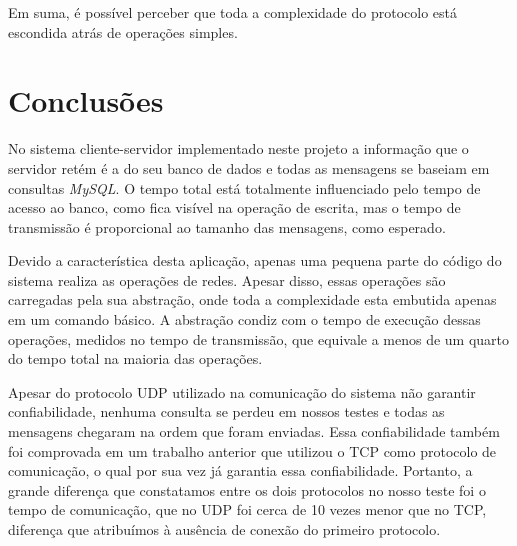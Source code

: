 \documentclass[12pt,a4paper]{article}
\begin{document}
Em suma, é possível perceber que toda a complexidade do protocolo está escondida atrás de operações simples.

\section{Conclusões}

No sistema cliente-servidor implementado neste projeto a informação que o servidor retém é a do seu banco de dados e todas as mensagens se baseiam em consultas {\it MySQL}. O tempo total está totalmente influenciado pelo tempo de acesso ao banco, como fica visível na operação de escrita, mas o tempo de transmissão é proporcional ao tamanho das mensagens, como esperado.

Devido a característica desta aplicação, apenas uma pequena parte do código do sistema realiza as operações de redes. Apesar disso, essas operações são carregadas pela sua abstração, onde toda a complexidade esta embutida apenas em um comando básico. A abstração condiz com o tempo de execução dessas operações, medidos no tempo de transmissão, que equivale a menos de um quarto do tempo total na maioria das operações.

Apesar do protocolo UDP utilizado na comunicação do sistema não garantir confiabilidade, nenhuma consulta se perdeu em nossos testes e todas as mensagens chegaram na ordem que foram enviadas. Essa confiabilidade também foi comprovada em um trabalho anterior que utilizou o TCP como protocolo de comunicação, o qual por sua vez já garantia essa confiabilidade. Portanto, a grande diferença que constatamos entre os dois protocolos no nosso teste foi o tempo de comunicação, que no UDP foi cerca de 10 vezes menor que no TCP, diferença que atribuímos à ausência de conexão do primeiro protocolo.


\singlespace


\end{document}
